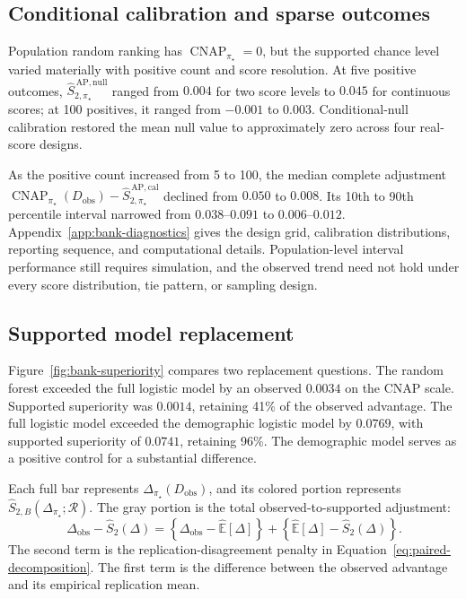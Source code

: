 \documentclass[11pt]{article}
\newcommand{\CNAP}{\operatorname{CNAP}}
\newcommand{\Regime}{\mathcal{R}}
\newcommand{\Tpi}{\CNAP_{\pi_\star}}
\newcommand{\E}{\mathbb{E}}
\newcommand{\SAPnullHat}{\widehat S_{2,\pi_\star}^{\,\mathrm{AP,null}}}
\newcommand{\SAPcalHat}{\widehat S_{2,\pi_\star}^{\,\mathrm{AP,cal}}}
\theoremstyle{remark}
\begin{document}
\subsection{Conditional calibration and sparse outcomes}

Population random ranking has $\CNAP_{\pi_\star}=0$, but the supported chance level varied materially with positive count and score resolution. At five positive outcomes, $\SAPnullHat$ ranged from $0.004$ for two score levels to $0.045$ for continuous scores; at 100 positives, it ranged from $-0.001$ to $0.003$. Conditional-null calibration restored the mean null value to approximately zero across four real-score designs.

As the positive count increased from 5 to 100, the median complete adjustment $\Tpi(D_{\mathrm{obs}})-\SAPcalHat$ declined from $0.050$ to $0.008$. Its 10th to 90th percentile interval narrowed from $0.038$--$0.091$ to $0.006$--$0.012$. Appendix~\ref{app:bank-diagnostics} gives the design grid, calibration distributions, reporting sequence, and computational details. Population-level interval performance still requires simulation, and the observed trend need not hold under every score distribution, tie pattern, or sampling design.

\subsection{Supported model replacement}

Figure~\ref{fig:bank-superiority} compares two replacement questions. The random forest exceeded the full logistic model by an observed $0.0034$ on the CNAP scale. Supported superiority was $0.0014$, retaining 41\% of the observed advantage. The full logistic model exceeded the demographic logistic model by $0.0769$, with supported superiority of $0.0741$, retaining 96\%. The demographic model serves as a positive control for a substantial difference.

Each full bar represents $\Delta_{\pi_\star}(D_{\mathrm{obs}})$, and its colored portion represents $\widehat S_{2,B}(\Delta_{\pi_\star};\Regime)$. The gray portion is the total observed-to-supported adjustment:
\[
\Delta_{\mathrm{obs}}-\widehat S_2(\Delta)
=
\left\{
\Delta_{\mathrm{obs}}-\widehat{\E}[\Delta]
\right\}
+
\left\{
\widehat{\E}[\Delta]-\widehat S_2(\Delta)
\right\}.
\]
The second term is the replication-disagreement penalty in Equation~\eqref{eq:paired-decomposition}. The first term is the difference between the observed advantage and its empirical replication mean.
\end{document}
